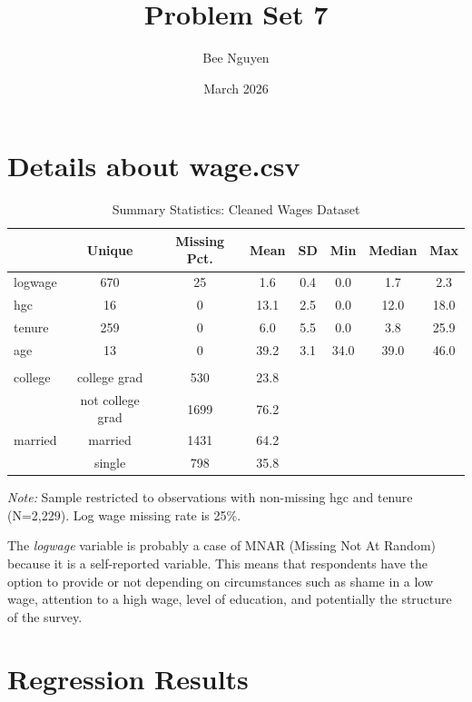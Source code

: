 \documentclass{article}
\title{Problem Set 7}
\author{Bee Nguyen}
\date{March 2026}
\begin{document}
\maketitle

\section{Details about wage.csv}

\begin{table}[htbp]
\centering
\caption{Summary Statistics: Cleaned Wages Dataset}
\label{tab:wages_summary}
\begin{tabular}{lccccccc}
\toprule
& Unique & Missing Pct. & Mean & SD & Min & Median & Max \\
\midrule
logwage & 670 & 25 & 1.6 & 0.4 & 0.0 & 1.7 & 2.3 \\
hgc & 16 & 0 & 13.1 & 2.5 & 0.0 & 12.0 & 18.0 \\
tenure & 259 & 0 & 6.0 & 5.5 & 0.0 & 3.8 & 25.9 \\
age & 13 & 0 & 39.2 & 3.1 & 34.0 & 39.0 & 46.0 \\
\addlinespace
\multicolumn{8}{c}{\textit{Categorical Variables}} \\
\addlinespace
college & college grad & 530 & 23.8 & & & & \\
& not college grad & 1699 & 76.2 & & & & \\
\addlinespace
married & married & 1431 & 64.2 & & & & \\
& single & 798 & 35.8 & & & & \\
\bottomrule
\end{tabular}
\parbox{0.9\linewidth}{\footnotesize \textit{Note:} Sample restricted to observations with non-missing hgc and tenure (N=2,229). Log wage missing rate is 25\%.}
\end{table}

The \textit{logwage} variable is probably a case of MNAR (Missing Not At Random) because it is a self-reported variable. This means that respondents have the option to provide or not depending on circumstances such as shame in a low wage, attention to a high wage, level of education, and potentially the structure of the survey. 


\section{Regression Results}
\end{document}
